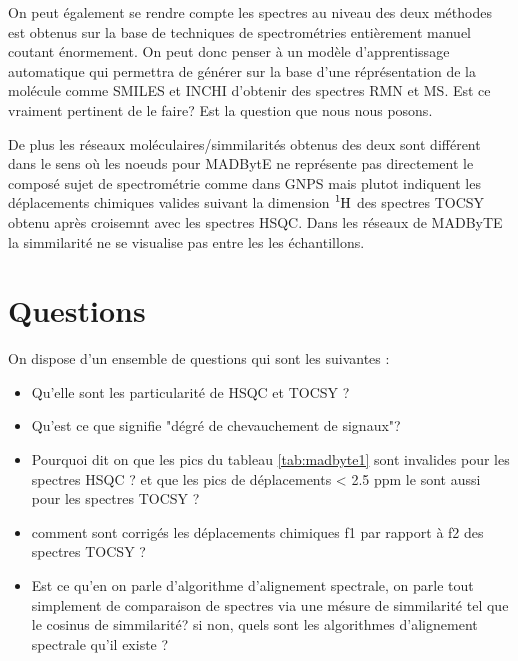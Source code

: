 \documentclass[12pt, french, latin.medieval, a4paper]{report}
\begin{document}
    On peut également se rendre compte les spectres au niveau des deux méthodes est obtenus sur la base de techniques de spectrométries entièrement manuel coutant énormement. On peut donc penser à un modèle d'apprentissage automatique qui permettra de générer sur la base d'une réprésentation de la molécule comme SMILES et INCHI d'obtenir des spectres RMN et MS. Est ce vraiment pertinent de le faire? Est la question que nous nous posons.

    De plus les réseaux moléculaires/simmilarités obtenus des deux sont différent  dans le sens où les noeuds pour MADBytE ne représente pas directement le composé sujet de spectrométrie comme dans GNPS mais plutot indiquent les déplacements chimiques valides suivant la dimension $\ce{^{1}_{}H}$ des spectres TOCSY obtenu après croisemnt avec les spectres HSQC. Dans les réseaux de MADByTE la simmilarité ne se visualise pas entre les les échantillons.

    
    \section{Questions}
    On dispose d'un ensemble de questions qui sont les suivantes :
    \begin{itemize}
        \item Qu'elle sont les particularité de HSQC et TOCSY ?
        \item Qu'est ce que signifie "dégré de chevauchement de signaux"?
        \item Pourquoi dit on que les pics du tableau \ref{tab:madbyte1} sont invalides pour les spectres HSQC ? et que les pics de déplacements < 2.5 ppm le sont aussi pour les spectres TOCSY ?
        \item comment sont corrigés les déplacements chimiques f1 par rapport à f2 des spectres TOCSY ?
        \item Est ce qu'en on parle d'algorithme d'alignement spectrale, on parle tout simplement de comparaison de spectres via une mésure de simmilarité tel que le cosinus de simmilarité? si non, quels sont les algorithmes d'alignement spectrale qu'il existe ?
    \end{itemize}

    



    
\end{document}

